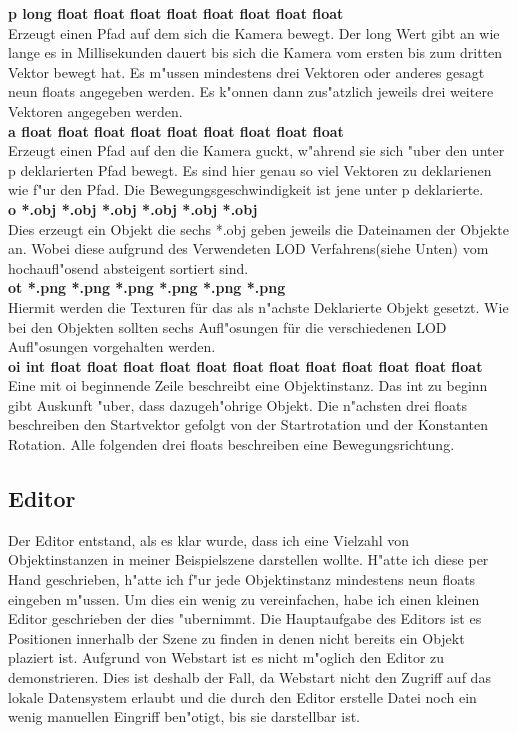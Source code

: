 \documentclass[a4paper,titlepage]{article}
\begin{document}
\textbf{p long float float float float float float float float}\\
Erzeugt einen Pfad auf dem sich die Kamera bewegt. Der long Wert gibt an wie lange es in Millisekunden dauert
bis sich die Kamera vom ersten bis zum dritten Vektor bewegt hat. Es m"ussen mindestens drei Vektoren oder anderes
gesagt neun floats angegeben werden. Es k"onnen dann zus"atzlich jeweils drei weitere Vektoren angegeben werden.\\

\textbf{a float float float float float float float float float}\\
Erzeugt einen Pfad auf den die Kamera guckt, w"ahrend sie sich "uber den unter p deklarierten Pfad bewegt.
Es sind hier genau so viel Vektoren zu deklarienen wie f"ur den Pfad. Die Bewegungsgeschwindigkeit ist jene
unter p deklarierte.\\

\textbf{o *.obj *.obj *.obj *.obj *.obj *.obj}\\
Dies erzeugt ein Objekt die sechs *.obj geben jeweils die Dateinamen der Objekte an. Wobei diese aufgrund des
Verwendeten LOD Verfahrens(siehe Unten) vom hochaufl"osend absteigent sortiert sind.\\

\textbf{ot *.png *.png *.png *.png *.png *.png}\\
Hiermit werden die Texturen für das als n"achste Deklarierte Objekt gesetzt. Wie bei den Objekten sollten sechs
Aufl"osungen für die verschiedenen LOD Aufl"osungen vorgehalten werden.\\

\textbf{oi int float float float float float float float float float float float float}\\
Eine mit oi beginnende Zeile beschreibt eine Objektinstanz. Das int zu beginn gibt Auskunft "uber, dass
dazugeh"ohrige Objekt. Die n"achsten drei floats beschreiben den Startvektor gefolgt von der Startrotation
und der Konstanten Rotation. Alle folgenden drei floats beschreiben eine Bewegungsrichtung.\\

\subsection{Editor} 
Der Editor entstand, als es klar wurde, dass ich eine Vielzahl von Objektinstanzen in meiner Beispielszene darstellen
wollte. H"atte ich diese per Hand geschrieben, h"atte ich f"ur jede Objektinstanz mindestens neun floats eingeben m"ussen. 
Um dies ein wenig zu vereinfachen, habe ich einen kleinen Editor geschrieben der dies "ubernimmt.
Die Hauptaufgabe des Editors ist es Positionen innerhalb der Szene zu finden in denen nicht bereits ein Objekt
plaziert ist. Aufgrund von Webstart ist es nicht m"oglich den Editor zu demonstrieren. Dies ist deshalb der Fall, 
da Webstart nicht den Zugriff auf das lokale Datensystem erlaubt und die durch den Editor erstelle Datei noch ein wenig
manuellen Eingriff ben"otigt, bis sie darstellbar ist.
\end{document}
